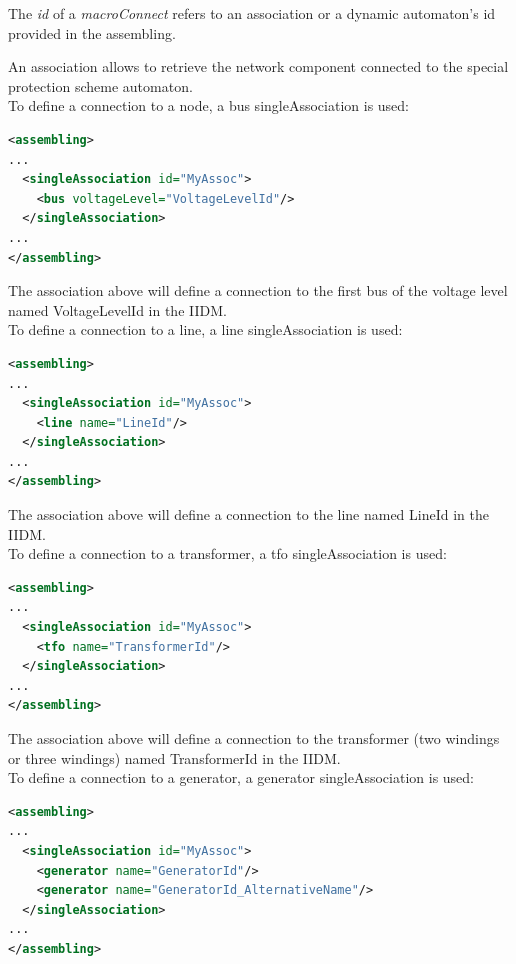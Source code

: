 \documentclass[a4paper, 12pt]{report}
\begin{document}
The \textit{id} of a \textit{macroConnect} refers to an association or a dynamic automaton's id provided in the assembling.

An association allows to retrieve the network component connected to the special protection scheme automaton. \\

To define a connection to a node, a bus singleAssociation is used:
 \begin{lstlisting}[language=XML, breaklines=true, breakatwhitespace=false, columns=fullflexible]
<assembling>
...
  <singleAssociation id="MyAssoc">
    <bus voltageLevel="VoltageLevelId"/>
  </singleAssociation>
...
</assembling>
\end{lstlisting}

The association above will define a connection to the first bus of the voltage level named VoltageLevelId in the IIDM. \\

To define a connection to a line, a line singleAssociation is used:

 \begin{lstlisting}[language=XML, breaklines=true, breakatwhitespace=false, columns=fullflexible]
<assembling>
...
  <singleAssociation id="MyAssoc">
    <line name="LineId"/>
  </singleAssociation>
...
</assembling>
\end{lstlisting}

The association above will define a connection to the line named LineId in the IIDM. \\

To define a connection to a transformer, a tfo singleAssociation is used:

 \begin{lstlisting}[language=XML, breaklines=true, breakatwhitespace=false, columns=fullflexible]
<assembling>
...
  <singleAssociation id="MyAssoc">
    <tfo name="TransformerId"/>
  </singleAssociation>
...
</assembling>
\end{lstlisting}

The association above will define a connection to the transformer (two windings or three windings) named TransformerId in the IIDM. \\

To define a connection to a generator, a generator singleAssociation is used:

 \begin{lstlisting}[language=XML, breaklines=true, breakatwhitespace=false, columns=fullflexible]
<assembling>
...
  <singleAssociation id="MyAssoc">
    <generator name="GeneratorId"/>
    <generator name="GeneratorId_AlternativeName"/>
  </singleAssociation>
...
</assembling>
\end{lstlisting}
\end{document}
